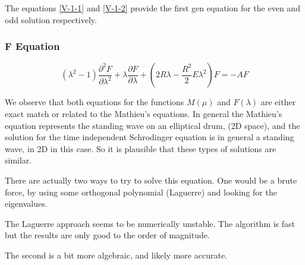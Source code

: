 The equations \ref{V-1-1} and \ref{V-1-2} provide the first gen equation for the even and odd solution respectively.

\subsubsection{F Equation}

\begin{equation}\label{eqLambda}
(\lambda^2-1)\frac{\partial^2 F}{\partial \lambda^2} + \lambda\frac{\partial F}{\partial \lambda} + \left(2R\lambda -  \frac{R^2}{2} E\lambda^2\right) F = -AF
\end{equation}

We observe that both equations for the functions $ M(\mu) $ and $ F(\lambda) $ are either exact match or related to the Mathieu's equations. In general the Mathieu's equation represents the standing wave on an elliptical drum, (2D space), and the solution for the time independent Schrodinger equation is in general a standing wave, in 2D in this case. So it is plausible that these types of solutions are similar.

There are actually two ways to try to solve this equation. One would be a brute force, by using some orthogonal polynomial (Laguerre) and looking for the eigenvalues.

The Laguerre approach seems to be numerically unstable. The algorithm is fast but the results are only good to the order of magnitude. 

The second is a bit more algebraic, and likely more accurate.

